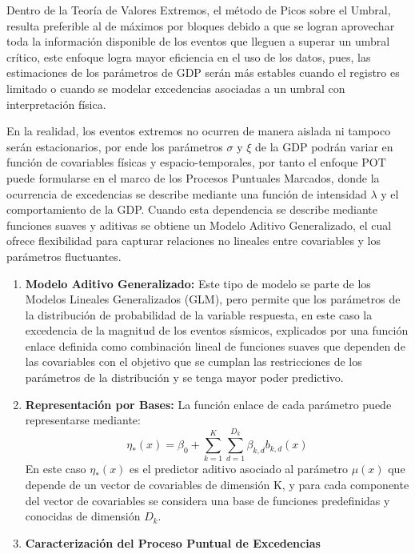 \begin{enumerate}
    Dentro de la Teoría de Valores Extremos, el método de Picos sobre el Umbral, resulta preferible al de máximos por bloques debido a que se logran aprovechar toda la información disponible de los eventos
    que lleguen a superar un umbral crítico, este enfoque logra mayor eficiencia en el uso de los datos, pues, las estimaciones de los parámetros de GDP serán más estables cuando el registro es limitado o cuando se modelar
    excedencias asociadas a un umbral con interpretación física. \cite{coles2001introduction}
    
    En la realidad, los eventos extremos no ocurren de manera aislada ni tampoco serán estacionarios, por ende los parámetros $\sigma$ y $\xi$ de la GDP podrán variar en función de covariables físicas y espacio-temporales, por tanto
    el enfoque POT puede formularse en el marco de los Procesos Puntuales Marcados, donde la ocurrencia de excedencias se describe mediante una función de intensidad $\lambda$ y el comportamiento de la GDP. Cuando esta dependencia 
    se describe mediante funciones suaves y aditivas se obtiene un Modelo Aditivo Generalizado, el cual ofrece flexibilidad para capturar relaciones no lineales entre covariables y los parámetros fluctuantes.
    \begin{enumerate}
        \item \textbf{Modelo Aditivo Generalizado:} Este tipo de modelo se parte de los Modelos Lineales Generalizados (GLM), pero permite que los parámetros de la distribución de probabilidad de la variable respuesta, en este caso
        la excedencia de la magnitud de los eventos sísmicos, explicados por una función enlace definida como combinación lineal de funciones suaves que dependen de las covariables con el objetivo que se cumplan las restricciones de los parámetros de la distribución
        y se tenga mayor poder predictivo.

        \item \textbf{Representación por Bases:} La función enlace de cada parámetro puede representarse mediante:
        \begin{equation*}
            \eta_*(x)=\beta_0+\sum_{k=1}^{K}\sum_{d=1}^{D_k} \beta_{k,d} b_{k,d}(x)
        \end{equation*}
        En este caso $\eta_*(x)$ es el predictor aditivo asociado al parámetro $\mu(x)$ que depende de un vector de covariables de dimensión K, y para cada componente del vector de covariables se considera una base de funciones
        predefinidas y conocidas de dimensión $D_k$.

        \item \textbf{Caracterización del Proceso Puntual de Excedencias}
    \end{enumerate}
    \cite{youngman2022evgam}

\end{enumerate}


